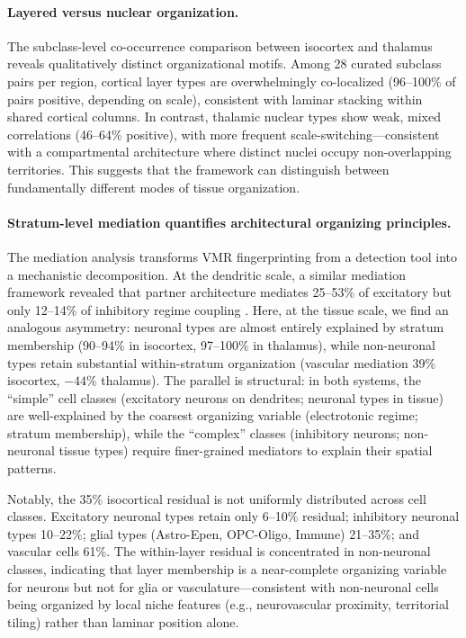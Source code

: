 \documentclass[11pt,a4paper]{article}
\begin{document}
\paragraph{Layered versus nuclear organization.}
The subclass-level co-occurrence comparison between isocortex and thalamus
reveals qualitatively distinct organizational motifs. Among 28 curated subclass pairs per region, cortical layer types are
overwhelmingly co-localized (96--100\% of pairs positive, depending on scale),
consistent with laminar stacking within shared cortical columns. In contrast,
thalamic nuclear types show weak, mixed correlations (46--64\% positive), with
more frequent scale-switching---consistent with a compartmental architecture
where distinct nuclei occupy non-overlapping territories. This suggests that the
framework can distinguish between fundamentally different modes of tissue
organization.

\paragraph{Stratum-level mediation quantifies architectural organizing principles.}
The mediation analysis transforms VMR fingerprinting from a detection tool into a
mechanistic decomposition. At the dendritic scale, a similar mediation framework
revealed that partner architecture mediates 25--53\% of excitatory but only
12--14\% of inhibitory regime coupling \citep{voruganti2026population}. Here, at the
tissue scale, we find an analogous asymmetry: neuronal types are almost entirely
explained by stratum membership (90--94\% in isocortex, 97--100\% in thalamus),
while non-neuronal types retain substantial within-stratum organization (vascular
mediation 39\% isocortex, $-44$\% thalamus). The parallel is structural: in both
systems, the ``simple'' cell classes (excitatory neurons on dendrites; neuronal
types in tissue) are well-explained by the coarsest organizing variable
(electrotonic regime; stratum membership), while the ``complex'' classes
(inhibitory neurons; non-neuronal tissue types) require finer-grained mediators
to explain their spatial patterns.

Notably, the 35\% isocortical residual is not uniformly distributed across cell
classes. Excitatory neuronal types retain only 6--10\% residual; inhibitory neuronal
types 10--22\%; glial types (Astro-Epen, OPC-Oligo, Immune) 21--35\%; and
vascular cells 61\%. The within-layer residual is concentrated in non-neuronal
classes, indicating that layer membership is a near-complete organizing variable
for neurons but not for glia or vasculature---consistent with non-neuronal cells
being organized by local niche features (e.g., neurovascular proximity, territorial
tiling) rather than laminar position alone.
\end{document}
